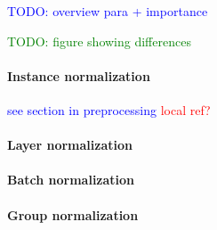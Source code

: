 \textcolor{blue}{TODO: overview para + importance}

\textcolor{green}{TODO: figure showing differences}

\paragraph{Instance normalization}

\textcolor{blue}{see section in preprocessing \textcolor{red}{local ref?}}

\paragraph{Layer normalization}

\paragraph{Batch normalization}

\paragraph{Group normalization}